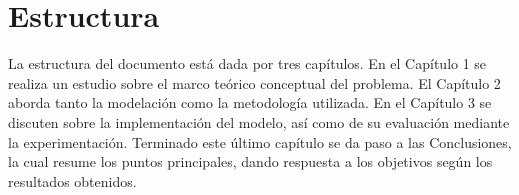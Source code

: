\section{Estructura}
La estructura del documento est\'a dada por tres capítulos. En el Capítulo 1 se
realiza un estudio sobre el marco teórico conceptual del problema. El Capítulo 2 aborda tanto la modelación como la metodolog\'ia utilizada. 
En el Capítulo 3
se discuten sobre la implementación del modelo, as\'i como de su evaluaci\'on mediante la experimentaci\'on. Terminado este \'ultimo cap\'itulo
se da paso a las Conclusiones, la cual resume los puntos principales,
dando respuesta a los objetivos según los resultados obtenidos.